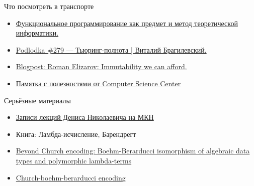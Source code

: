     \begin{frame}{Что посмотреть в транспорте}
        \begin{itemize}
            \item \href{https://youtu.be/oiUO1L4TOLI}{\color{blue} Функциональное программирование как предмет и метод теоретической информатики.}
            \item \href{https://youtu.be/YWelsG4mbik}{\color{blue} Podlodka \#279 --- Тьюринг-полнота | Виталий Брагилевский.}
            \item \href{https://elizarov.medium.com/immutability-we-can-afford-10c0dcb8351d}{\color{blue} Blogpost: Roman Elizarov: Immutability we can afford.}
            \item \href{https://compscicenter.notion.site/compscicenter/b6dddf00bc7d497298179a3bdbdda375}{\color{blue}Памятка с полезностями от Computer Science Center}
        \end{itemize}
    \end{frame}

    \begin{frame}{Серьёзные материалы}
        \begin{itemize}
            \item \href{https://www.youtube.com/playlist?list=PL-_cKNuVAYAVX_q9XOKoFm95234G6YfOj}{\color{blue} Записи лекций Дениса Николаевича на МКН}
            \item Книга: Ламбда-исчисление, Барендрегт
            \item \href{https://okmij.org/ftp/tagless-final/course/Boehm-Berarducci.html}{\color{blue} Beyond Church encoding: Boehm-Berarducci isomorphism of algebraic data types and polymorphic lambda-terms}
            \item \href{https://okmij.org/ftp/tagless-final/course/Boehm-Berarducci.html}{\color{blue} Church-boehm-berarducci encoding}
        \end{itemize}
    \end{frame}


